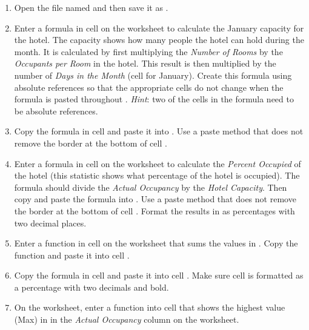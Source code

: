 \begin{enumbox}
	\begin{enumerate}
		\item Open the file named  and then save it as .
		
		\item Enter a formula in cell  on the  worksheet to calculate the January capacity for the hotel. The capacity shows how many people the hotel can hold during the month. It is calculated by first multiplying the \textit{Number of Rooms} by the \textit{Occupants per Room} in the hotel. This result is then multiplied by the number of \textit{Days in the Month} (cell  for January). Create this formula using absolute references so that the appropriate cells do not change when the formula is pasted throughout . \textit{Hint}: two of the cells in the formula need to be absolute references.
		
		\item Copy the formula in cell  and paste it into . Use a paste method that does not remove the border at the bottom of cell .
		
		\item Enter a formula in cell  on the  worksheet to calculate the \textit{Percent Occupied} of the hotel (this statistic shows what percentage of the hotel is occupied). The formula should divide the \textit{Actual Occupancy} by the \textit{Hotel Capacity}. Then copy and paste the formula into . Use a paste method that does not remove the border at the bottom of cell . Format the results in  as percentages with two decimal places.
		
		\item Enter a function in cell  on the  worksheet that sums the values in . Copy the function and paste it into cell .
		
		\item Copy the formula in cell  and paste it into cell . Make sure cell  is formatted as a percentage with two decimals and bold.
		
		\item On the  worksheet, enter a function into cell  that shows the highest value (Max) in  in the \textit{Actual Occupancy} column on the  worksheet.
		

\end{enumerate}
\end{enumbox}
